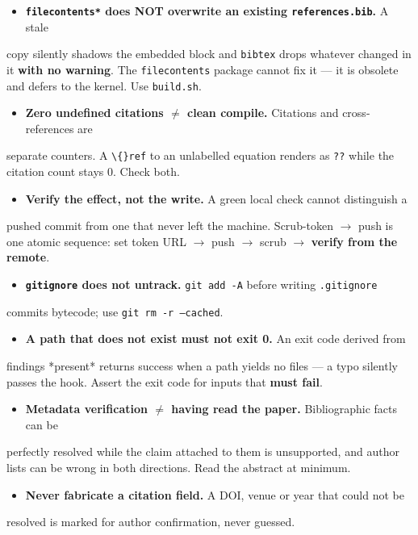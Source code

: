 \documentclass[10pt,a4paper]{article}
\begin{document}
\begin{itemize}
\item \textbf{\texttt{filecontents*} does NOT overwrite an existing \texttt{references.bib}.} A stale
\end{itemize}
  copy silently shadows the embedded block and \texttt{bibtex} drops whatever changed in
  it \textbf{with no warning}. The \texttt{filecontents} package cannot fix it --- it is
  obsolete and defers to the kernel. Use \texttt{build.sh}.
\begin{itemize}
\item \textbf{Zero undefined citations $\neq$ clean compile.} Citations and cross-references are
\end{itemize}
  separate counters. A \texttt{\textbackslash\{\}ref} to an unlabelled equation renders as \texttt{??} while the
  citation count stays 0. Check both.
\begin{itemize}
\item \textbf{Verify the effect, not the write.} A green local check cannot distinguish a
\end{itemize}
  pushed commit from one that never left the machine. Scrub-token $\rightarrow$ push is one
  atomic sequence: set token URL $\rightarrow$ push $\rightarrow$ scrub $\rightarrow$ \textbf{verify from the remote}.
\begin{itemize}
\item \textbf{\texttt{gitignore} does not untrack.} \texttt{git add -A} before writing \texttt{.gitignore}
\end{itemize}
  commits bytecode; use \texttt{git rm -r --cached}.
\begin{itemize}
\item \textbf{A path that does not exist must not exit 0.} An exit code derived from
\end{itemize}
  findings *present* returns success when a path yields no files --- a typo silently
  passes the hook. Assert the exit code for inputs that \textbf{must fail}.
\begin{itemize}
\item \textbf{Metadata verification $\neq$ having read the paper.} Bibliographic facts can be
\end{itemize}
  perfectly resolved while the claim attached to them is unsupported, and author
  lists can be wrong in both directions. Read the abstract at minimum.
\begin{itemize}
\item \textbf{Never fabricate a citation field.} A DOI, venue or year that could not be
\end{itemize}
  resolved is marked for author confirmation, never guessed.
\end{document}
